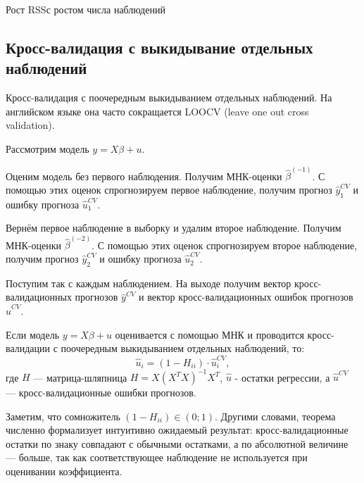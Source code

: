 \documentclass[12pt]{article}
\newcommand{\hb}{\hat{\beta}}
\newcommand{\RSS}{RSS}
\begin{document}
Рост \RSS с ростом числа наблюдений



\subsection{Кросс-валидация с выкидывание отдельных наблюдений}


\begin{definition}[LOOCV]
Кросс-валидация с поочередным выкидыванием отдельных наблюдений. 
На английском языке она часто сокращается LOOCV (leave one out cross validation).

Рассмотрим модель $y=X\beta + u$. 

Оценим модель без первого наблюдения. Получим МНК-оценки $\hb^{(-1)}$.
С помощью этих оценок спрогнозируем первое наблюдение, получим прогноз $\hat y_1^{CV}$ и ошибку прогноза $\hat u_1^{CV}$.

Вернём первое наблюдение в выборку и удалим второе наблюдение. Получим МНК-оценки $\hb^{(-2)}$.
С помощью этих оценок спрогнозируем второе наблюдение, получим прогноз $\hat y_2^{CV}$ и ошибку прогноза $\hat u_2^{CV}$.

Поступим так с каждым наблюдением. На выходе получим вектор кросс-валидационных прогнозов $\hat y^{CV}$ и вектор кросс-валидационных ошибок прогнозов $\hat u^{CV}$.    
\end{definition}

\begin{theorem}
Если модель $y=X\beta + u$ оценивается с помощью МНК и проводится кросс-валидации с поочередным выкидыванием отдельных наблюдений, то:
\[
\hat u_i = (1 - H_{ii}) \cdot \hat u_i^{CV},
\]
где $H$ — матрица-шляпница $H = X(X^TX)^{-1}X^T$, $\hat u$ - остатки регрессии, а $\hat u^{CV}$ — кросс-валидационные ошибки прогнозов.
\end{theorem}

Заметим, что сомножитель $(1 - H_{ii}) \in (0;1)$. 
Другими словами, теорема численно формализует интуитивно ожидаемый результат: кросс-валидационные остатки по знаку совпадают с обычными остатками, а по абсолютной величине — больше, так как соответствующее наблюдение не используется при оценивании коэффициента. 
\end{document}
